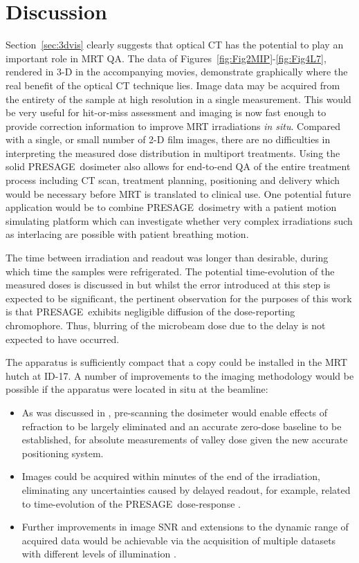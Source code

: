 	
	\section{Discussion}
	Section~\ref{sec:3dvis} clearly suggests that optical CT has the potential to play an important role in MRT QA. The data of Figures~\ref{fig:Fig2MIP}-\ref{fig:Fig4L7}, rendered in 3-D in the accompanying movies, demonstrate graphically where the real benefit of the optical CT technique lies. Image data may be acquired from the entirety of the sample at high resolution in a single measurement. This would be very useful for hit-or-miss assessment and imaging is now fast enough to provide correction information to improve MRT irradiations \textit{in situ}. Compared with a single, or small number of 2-D film images, there are no difficulties in interpreting the measured dose distribution in multiport treatments. Using the solid PRESAGE\textregistered \ dosimeter also allows for end-to-end QA of the entire treatment process including CT scan, treatment planning, positioning and delivery which would be necessary before MRT is translated to clinical use. One potential future application would be to combine PRESAGE\textregistered \ dosimetry with a patient motion simulating platform which can investigate whether very complex irradiations such as interlacing are possible with patient breathing motion. 
	
	The time between irradiation and readout was longer than desirable, during which time the samples were refrigerated. The potential time-evolution of the measured doses is discussed in \cite{doranestablishing2013} but whilst the error introduced at this step is expected to be significant, the pertinent observation for the purposes of this work is that PRESAGE\textregistered \ exhibits negligible diffusion of the dose-reporting chromophore. Thus, blurring of the microbeam dose due to the delay is not expected to have occurred.
	
	The apparatus is sufficiently compact that a copy could be installed in the MRT hutch at ID-17. A number of improvements to the imaging methodology would be possible if the apparatus were located in situ at the beamline:
	\begin{itemize}
		\item As was discussed in \cite{doranestablishing2013}, pre-scanning the dosimeter would enable effects of refraction to be largely eliminated and an accurate zero-dose baseline to be established, for absolute measurements of valley dose given the new accurate positioning system.
		\item Images could be acquired within minutes of the end of the irradiation, eliminating any uncertainties caused by delayed readout, for example, related to time-evolution of the PRESAGE\textregistered \ dose-response \cite{skyttemperature2011 , skyttemperature2012}.   
		\item Further improvements in image SNR and extensions to the dynamic range of acquired data would be achievable via the acquisition of multiple datasets with different levels of illumination \cite{krstajiccharacterization2007 , thomasa2011}.
	\end{itemize}
	
